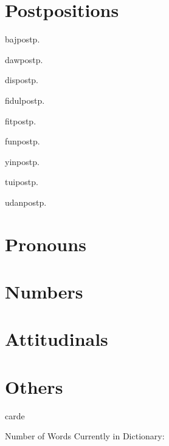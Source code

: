 \begin{multicols*}{2}
\section{Postpositions}

\begin{description}[leftmargin=*]
    \begin{dictentry}{baj}{postp.}
    \end{dictentry}
    \begin{dictentry}{daw}{postp.}
    \end{dictentry}
    \begin{dictentry}{dis}{postp.}
    \end{dictentry}
    \begin{dictentry}{fidul}{postp.}
    \end{dictentry}
    \begin{dictentry}{fit}{postp.}
    \end{dictentry}
    \begin{dictentry}{fun}{postp.}
    \end{dictentry}
    \begin{dictentry}{yin}{postp.}
    \end{dictentry}
    \begin{dictentry}{tui}{postp.}
    \end{dictentry}
    \begin{dictentry}{udan}{postp.}
    \end{dictentry}
\end{description}

\section{Pronouns}

\section{Numbers}

\section{Attitudinals}

\section{Others}

\begin{description}[leftmargin=*]
    \begin{dictentry}{carde}{}
    \end{dictentry}
\end{description}

\end{multicols*}
\vspace{\fill}
Number of Words Currently in Dictionary: \thedictwordcount